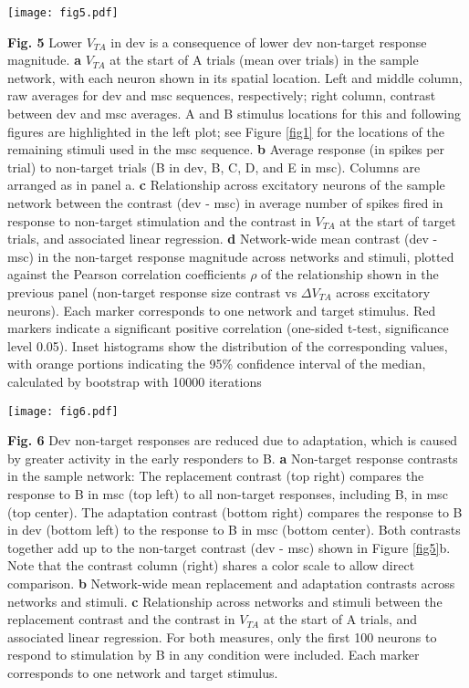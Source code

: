 \documentclass[pdflatex,referee,iicol,sn-basic]{sn-jnl}
\theoremstyle{thmstyleone}%
\theoremstyle{thmstyletwo}%
\theoremstyle{thmstylethree}%
\begin{document}
\begin{figure*}%
    \centering
    \texttt{[image: fig5.pdf]}
    \caption{}
    \label{fig5}
\end{figure*}
\textbf{Fig. 5} Lower $V_{TA}$ in dev is a consequence of lower dev non-target response magnitude.
\textbf{a} $V_{TA}$ at the start of A trials (mean over trials) in the sample network, with each neuron shown in its spatial location. Left and middle column, raw averages for dev and msc sequences, respectively; right column, contrast between dev and msc averages. A and B stimulus locations for this and following figures are highlighted in the left plot; see Figure \ref{fig1} for the locations of the remaining stimuli used in the msc sequence.
\textbf{b} Average response (in spikes per trial) to non-target trials (B in dev, B, C, D, and E in msc). Columns are arranged as in panel a.
\textbf{c} Relationship across excitatory neurons of the sample network between the contrast (dev - msc) in average number of spikes fired in response to non-target stimulation and the contrast in $V_{TA}$ at the start of target trials, and associated linear regression.
\textbf{d} Network-wide mean contrast (dev - msc) in the non-target response magnitude across networks and stimuli, plotted against the Pearson correlation coefficients $\rho$ of the relationship shown in the previous panel (non-target response size contrast vs $\Delta V_{TA}$ across excitatory neurons). Each marker corresponds to one network and target stimulus. Red markers indicate a significant positive correlation (one-sided t-test, significance level 0.05). Inset histograms show the distribution of the corresponding values, with orange portions indicating the 95\% confidence interval of the median, calculated by bootstrap with 10000 iterations

\begin{figure*}%
    \centering
    \texttt{[image: fig6.pdf]}
    \caption{}
    \label{fig6}
\end{figure*}
\textbf{Fig. 6} Dev non-target responses are reduced due to adaptation, which is caused by greater activity in the early responders to B.
\textbf{a} Non-target response contrasts in the sample network: The replacement contrast (top right) compares the response to B in msc (top left) to all non-target responses, including B, in msc (top center). The adaptation contrast (bottom right) compares the response to B in dev (bottom left) to the response to B in msc (bottom center). Both contrasts together add up to the non-target contrast (dev - msc) shown in Figure \ref{fig5}b. Note that the contrast column (right) shares a color scale to allow direct comparison.
\textbf{b} Network-wide mean replacement and adaptation contrasts across networks and stimuli.
\textbf{c} Relationship across networks and stimuli between the replacement contrast and the contrast in $V_{TA}$ at the start of A trials, and associated linear regression. For both measures, only the first 100 neurons to respond to stimulation by B in any condition were included. Each marker corresponds to one network and target stimulus.
\end{document}
